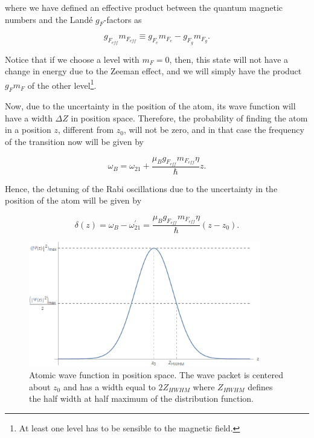 \documentclass{article}
\begin{document}
where we have defined an effective product between the quantum magnetic numbers and the Landé $g_{F}$-factors as

\begin{equation}
    g_{F_{eff}} m_{F_{eff}} \equiv g_{F_{e}} m_{F_{e}} - g_{F_{g}} m_{F_{g}}.
\end{equation}

Notice that if we choose a level with $m_{F}=0$, then, this state will not have a change in energy due to the Zeeman effect, and we will simply have the product $g_{F} m_{F}$ of the other level\footnote{At least one level has to be sensible to the magnetic field.}.

Now, due to the uncertainty in the position of the atom, its wave function will have a width $\Delta Z$ in position space. Therefore, the probability of finding the atom in a position $z$, different from $z_{0}$, will not be zero, and in that case the frequency of the transition now will be given by

\begin{equation}
  \omega_{B} =  \omega_{21} + \frac{\mu_{B} g_{F_{eff}} m_{F_{eff}} \eta}{\hbar} z.
\end{equation}

Hence, the detuning of the Rabi oscillations due to the uncertainty in the position of the atom will be given by

\begin{equation}\label{detunig_atom_width}
  \delta (z) = \omega_{B} - \omega_{21}^{\prime} = \frac{\mu_{B} g_{F_{eff}} m_{F_{eff}} \eta}{\hbar} (z-z_{0}).
\end{equation}

\begin{figure}
\centering
\includegraphics[width=0.9\textwidth]{atom_wave_func_pos_space.png}
\caption{Atomic wave function in position space. The wave packet is centered about $z_{0}$ and has a width equal to $2Z_{HWHM}$ where $Z_{HWHM}$ defines the half width at half maximum of the distribution function.}
\label{atom_wave_func_pos_space}
\end{figure}
\end{document}

